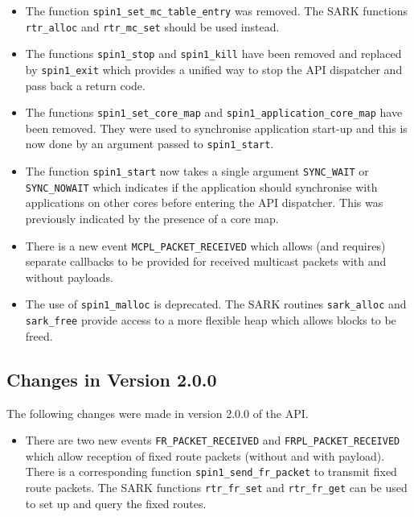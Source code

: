 \documentclass[11pt,a4paper,twoside]{article}
\begin{document}
\begin{itemize}

\item
The function \texttt{spin1\_set\_mc\_table\_entry} was removed. The
SARK functions \texttt{rtr\_alloc} and \texttt{rtr\_mc\_set} should be
used instead.

\item
The functions \texttt{spin1\_stop} and \texttt{spin1\_kill} have been
removed and replaced by \texttt{spin1\_exit} which provides a unified
way to stop the API dispatcher and pass back a return code.

\item
The functions \texttt{spin1\_set\_core\_map} and
\texttt{spin1\_application\_core\_map} have been removed. They were
used to synchronise application start-up and this is now done by an
argument passed to \texttt{spin1\_start}.

\item
The function \texttt{spin1\_start} now takes a single argument
\texttt{SYNC\_WAIT} or \texttt{SYNC\_NOWAIT} which indicates if
the application should synchronise with applications on other cores
before entering the API dispatcher. This was previously indicated
by the presence of a core map.

\item
There is a new event \texttt{MCPL\_PACKET\_RECEIVED} which allows (and
requires) separate callbacks to be provided for received multicast
packets with and without payloads.

\item
The use of \texttt{spin1\_malloc} is deprecated. The SARK routines
\texttt{sark\_alloc} and \texttt{sark\_free} provide access to a
more flexible heap which allows blocks to be freed.

\end{itemize}

\subsection{Changes in Version 2.0.0}

The following changes were made in version 2.0.0 of the API.

\begin{itemize}

\item
There are two new events \texttt{FR\_PACKET\_RECEIVED} and
\texttt{FRPL\_PACKET\_RECEIVED} which allow reception of
fixed route packets (without and with payload). There is a
corresponding function \texttt{spin1\_send\_fr\_packet} to
transmit fixed route packets. The SARK functions
\texttt{rtr\_fr\_set} and \texttt{rtr\_fr\_get} can be used
to set up and query the fixed routes.

\end{itemize}
\end{document}

